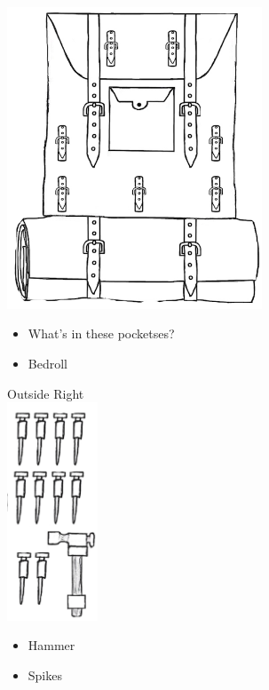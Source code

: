 \documentclass[11pt]{article}
\begin{document}
\begin{minipage}[t]{.5\textwidth}
    \normalsize{\ }\\
    \includegraphics[height=9.0cm]{img/Backpack.png}\\
    \begin{normalsize}
        \begin{itemize}[topsep=0pt, itemsep=0pt, partopsep=0pt, parsep=0pt]
            \item What's in these pocketses?
            \item Bedroll
        \end{itemize}
        \end{normalsize}
\end{minipage}
\begin{minipage}[t]{.248\textwidth}
    \normalsize{Outside Right}\\
    \includegraphics[height=6.5cm]{img/HammerAndPitons.png}\\
        \begin{itemize}[topsep=0pt, itemsep=0pt, partopsep=0pt, parsep=0pt]
            \item Hammer
            \item Spikes
        \end{itemize}
\end{minipage}
\end{document}

